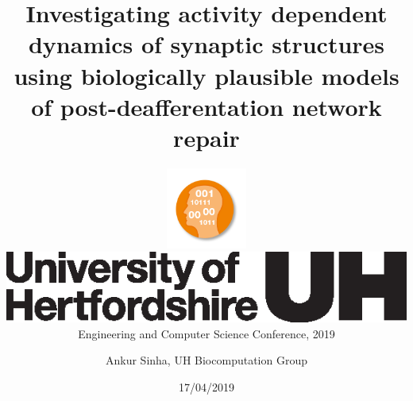 
\usepackage{color}
\usepackage{tipa}
\usepackage[scale=2]{ccicons}
\usepackage{amssymb}
\usepackage{tikz}
\usetikzlibrary{arrows.meta, arrows}
\usepackage{pgfplots}
\usepackage{jneurosci}
\usepackage{subfig}
\usepackage[T1]{fontenc}
\usepackage[utf8]{inputenc}
\usepackage[style=nature,backend=biber,autocite=footnote]{biblatex}

\usepackage[default,osfigures,scale=0.95]{opensans}
\usepackage[normalem]{ulem}
\usepackage{hyperref}
\hypersetup{colorlinks,linkcolor=Green,urlcolor=links}
\usepackage{graphicx}
\usepackage{algorithmic}
\usepackage{textcomp}
\usepackage{wrapfig}
\usepackage{textgreek}
\usepackage{euler}



\title{\centering Investigating activity dependent dynamics of synaptic structures using biologically plausible models of post-deafferentation network repair\\}
\subtitle{\centering\includegraphics[width=0.2\textwidth]{99_images/UH-IT-theme.png}\\\includegraphics[scale=0.6]{99_images/UH-Logo-Black.eps}\\\vspace{0.2cm}Engineering and Computer Science Conference, 2019\\}
\author[Ankur Sinha]{Ankur Sinha, UH Biocomputation Group}
\date{17/04/2019}

